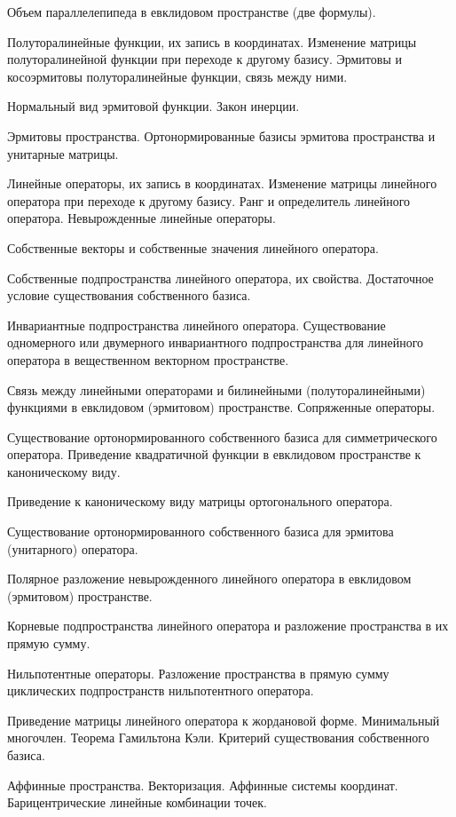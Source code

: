 \documentclass[a4paper]{article}
\begin{document}
\begin{nums}{-1}
\item Объем параллелепипеда в евклидовом пространстве (две формулы).
\item Полуторалинейные функции, их запись в координатах. Изменение матрицы полуторалинейной функции при переходе к другому базису.
Эрмитовы и косоэрмитовы полуторалинейные функции, связь между ними.
\item Нормальный вид эрмитовой функции. Закон инерции.
\item Эрмитовы пространства. Ортонормированные базисы эрмитова пространства и унитарные матрицы.
\item Линейные операторы, их запись в координатах. Изменение матрицы линейного оператора при переходе к другому базису. Ранг и
определитель линейного оператора. Невырожденные линейные операторы.
\item Собственные векторы и собственные значения линейного оператора.
\item Собственные подпространства линейного оператора, их свойства. Достаточное условие существования собственного базиса.
\item Инвариантные подпространства линейного оператора. Существование одномерного или двумерного инвариантного
подпространства для линейного оператора в вещественном векторном пространстве.
\item Связь между линейными операторами и билинейными (полуторалинейными) функциями в евклидовом (эрмитовом)
пространстве. Сопряженные операторы.
\item Существование ортонормированного собственного базиса для симметрического оператора. Приведение квадратичной функции в
евклидовом пространстве к каноническому виду.
\item Приведение к каноническому виду матрицы ортогонального оператора.
\item Существование ортонормированного собственного базиса для эрмитова (унитарного) оператора.
\item Полярное разложение невырожденного линейного оператора в евклидовом (эрмитовом) пространстве.
\item Корневые подпространства линейного оператора и разложение пространства в их прямую сумму.
\item Нильпотентные операторы. Разложение пространства в прямую сумму циклических подпространств нильпотентного оператора.
\item Приведение матрицы линейного оператора к жордановой форме. Минимальный многочлен. Теорема Гамильтона Кэли.
Критерий существования собственного базиса.
\item Аффинные пространства. Векторизация. Аффинные системы координат. Барицентрические линейные комбинации точек.

\end{nums}
\end{document}
